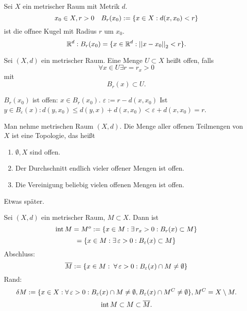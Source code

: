 \documentclass[../ana2.tex]{subfiles}
\begin{document}
\begin{defi}
    Sei \(X\) ein metrischer Raum mit Metrik \(d\).
    \[ x_0 \in X, r > 0 \quad B_r(x_0) 
    := \{ x\in X: d(x, x_0) < r \} \] 
    ist die offnee Kugel mit Radius \(r\) um \(x_0\).
    \[ \mathbb{R}^d: B_r(x_0) = \{x \in \mathbb{R}^d: 
    \left|\left|x - x_0\right|\right|_2 < r\}. \]
\end{defi}
\begin{defi}
    Sei \( (X,d) \) ein metrischer Raum. Eine Menge 
    \( U \subset X \) heißt offen, falls 
    \[ \forall x\in U \exists r = r_x > 0 \]
    mit 
    \[ B_r(x) \subset U. \]
\end{defi}
\begin{bsp}
    \( B_r(x_0) \) ist offen: 
    \( x \in B_r(x_0) \).
    \( \varepsilon := r - d(x, x_0) \)
    Ist \( y \in B_\varepsilon(x): d(y, x_0) 
    \leq d(y, x) + d(x, x_0) < \varepsilon 
    + d(x, x_0) = r \).
\end{bsp}
\begin{satz}[Topologie]
    Man nehme metrischen Raum \( (X, d) \).
    Die Menge aller offenen Teilmengen von \(X\) 
    ist eine Topologie, das heißt
    \begin{enumerate}[label=(\alph*)]
        \item \( \emptyset, X \) sind offen.
        \item Der Durchschnitt endlich vieler
        offener Mengen ist offen.
        \item Die Vereinigung beliebig vielen offenen
        Mengen ist offen. 
    \end{enumerate}    
\end{satz}
\begin{bew}
    Etwas später.
\end{bew}
\begin{defi}
    Sei \( (X, d) \) ein metrischer Raum, \( M \subset X \).
    Dann ist 
    \[ \inner M = M^o 
    := \set{x \in M: \exists r_x > 0: B_r(x)\subset M}\]
    \[= \set{x \in M: \exists \varepsilon > 0: 
    B_\varepsilon(x) \subset M }\]
    Abschluss:
    \[ \overline{M} := 
    \set{x \in M: \; \forall \varepsilon > 0: 
    B_\varepsilon(x) \cap M \neq \emptyset} \]
    Rand: 
    \[ \delta M := \set{ x \in X: \forall \varepsilon > 0: 
    B_\varepsilon(x) \cap M \neq \emptyset, 
    B_\varepsilon(x) \cap M^C \neq \emptyset },
    M^C = X \setminus M. \]
    \[ \operatorname{int} M \subset M \subset \overline{M}. \]
\end{defi}
\end{document}
